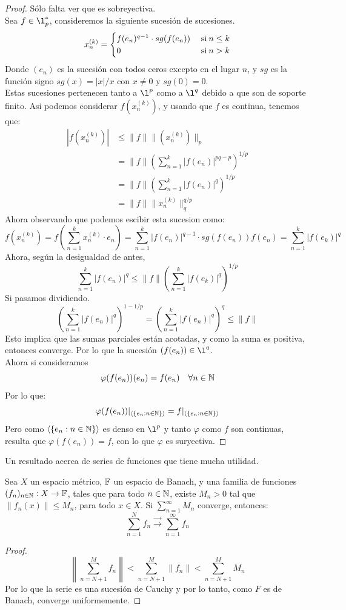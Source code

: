 \documentclass[12pt,a4paper]{book}
\begin{document}
\begin{teo}
\begin{proof}
Sólo falta ver que es sobreyectiva.\\
Sea $f \in \l_p^*$, consideremos la siguiente sucesión de sucesiones.
$$ x_n^{(k)} =
\begin{cases}
f(e_n)^{q-1} \cdot sg(f(e_n)) &\mathrm{\;si\:} n \leq k \\
0 &\mathrm{\;si\:} n > k
\end{cases}
$$
Donde $(e_n)$ es la sucesión con todos ceros excepto en el lugar $n$, y $sg$ es la función signo $ sg(x) = |x|/x$ con $x \neq 0$ y $sg(0)=0$.\\
Estas sucesiones pertenecen tanto a $\l^p$ como a $\l^q$ debido a que son de soporte finito.
Asi podemos considerar $f(x_n^{(k)})$, y usando que $f$ es continua, tenemos que:
\begin{align*}
|f(x_n^{(k)}) |&\leq \|f\| \|(x_n^{(k)})\|_p \\
&= \|f\| \left(\sum_{n = 1}^k |f(e_n)|^{pq-p}\right)^{1/p}\\
&= \|f\| \left(\sum_{n = 1}^k |f(e_n)|^q\right)^{1/p} \\
&= \|f\| \|x_n^{(k)}\|_q^{q/p}
\end{align*}
Ahora observando que podemos escibir esta sucesion como:
$$f(x_n^{(k)})= f\left(\sum_{n=1}^k x_n^{(k)} \cdot e_n \right)= \sum_{n=1}^k |f(e_n)|^{q-1} \cdot sg(f(e_n)) f(e_n) = \sum_{n=1}^k |f(e_k)|^q$$
Ahora, según la desigualdad de antes,
$$ \sum_{n=1}^k |f(e_n)|^q \leq \|f\| \left( \sum_{n = 1}^k |f(e_k)|^q \right)^{1/p}$$
Si pasamos dividiendo.
$$ \left(\sum_{n=1}^k |f(e_n)|^q \right)^{1-1/p} = \left(\sum_{n=1}^k |f(e_n)|^q \right)^q \leq \|f\|$$
Esto implica que las sumas parciales están acotadas, y como la suma es positiva, entonces converge. Por lo que la sucesión $(f(e_n)) \in \l^q$.\\
Ahora si consideramos
$$ \varphi(f(e_n))(e_n) = f(e_n) \quad \forall n \in \mathbb{N}$$
Por lo que:
$$ \varphi(f(e_n))|_{\langle \{ e_n : n \in \mathbb{N} \}\rangle}  = f |_{\langle \{ e_n : n \in \mathbb{N} \}\rangle}$$ 
Pero como $\langle \{ e_n : n \in \mathbb{N} \}\rangle$ es denso en $\l^p$ y tanto $\varphi$ como $f$ son continuas, resulta que $\varphi(f(e_n))=f$, con lo que $\varphi$ es suryectiva.
\end{proof}
\end{teo}
Un resultado acerca de series de funciones que tiene mucha utilidad.
\begin{prop}
Sea $X$ un espacio métrico, $\mathbb{F}$ un espacio de Banach, y una familia de funciones $(f_n)_{n \in \mathbb{N}} : X \rightarrow \mathbb{F}$, tales que para todo $n \in \mathbb{N}$, existe $ M_n > 0$ tal que  $\|f_n(x)\| \leq M_n $, para todo $x \in X$. Si $\sum_{n=1}^{\infty} M_n$ converge, entonces:
$$ \sum_{n=1}^{N} f_n \overrightarrow{\rightarrow} \displaystyle \sum_{n=1}^{\infty} f_n$$
\begin{proof}
$$\left\| \sum_{n=N+1}^{M} f_n \right\| < \sum_{n=N+1}^{M} \|f_n\| < \sum_{n=N+1}^{M} M_n$$
Por lo que la serie es una sucesión de Cauchy y por lo tanto, como $F$ es de Banach, converge uniformemente.
\end{proof}
\end{prop}
\end{document}
